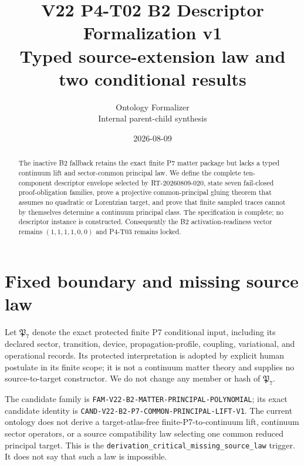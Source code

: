\documentclass[11pt]{article}
\title{V22 P4-T02 B2 Descriptor Formalization v1\\
\large Typed source-extension law and two conditional results}
\author{Ontology Formalizer\\\small Internal parent-child synthesis}
\date{2026-08-09}
\theoremstyle{definition}
\theoremstyle{plain}
\begin{document}
\raggedbottom
\maketitle

\begin{center}
\end{center}

\begin{abstract}
The inactive B2 fallback retains the exact finite P7 matter package but lacks
a typed continuum lift and sector-common principal law. We define the complete
ten-component descriptor envelope selected by RT-20260809-020, state seven
fail-closed proof-obligation families, prove a projective common-principal
gluing theorem that assumes no quadratic or Lorentzian target, and prove that
finite sampled traces cannot by themselves determine a continuum principal
class. The specification is complete; no descriptor instance is constructed.
Consequently the B2 activation-readiness vector remains
$(1,1,1,1,0,0)$ and P4-T03 remains locked.
\end{abstract}

\section{Fixed boundary and missing source law}

Let $\mathfrak P_7$ denote the exact protected finite P7 conditional input,
including its declared sector, transition, device, propagation-profile,
coupling, variational, and operational records. Its protected interpretation
is adopted by explicit human postulate in its finite scope; it is not a
continuum matter theory and supplies no source-to-target constructor. We do
not change any member or hash of $\mathfrak P_7$.

The candidate family is
\nolinkurl{FAM-V22-B2-MATTER-PRINCIPAL-POLYNOMIAL}; its exact candidate identity
is \nolinkurl{CAND-V22-B2-P7-COMMON-PRINCIPAL-LIFT-V1}. The current ontology does
not derive a target-atlas-free finite-P7-to-continuum lift, continuum sector
operators, or a source compatibility law selecting one common reduced
principal target. This is the
\nolinkurl{derivation_critical_missing_source_law} trigger. It does not say
that such a law is impossible.
\end{document}
